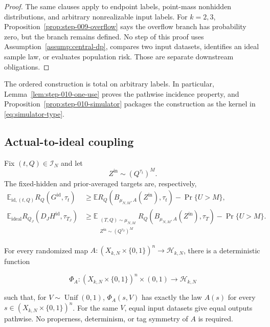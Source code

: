 \begin{proof}
The same clauses apply to endpoint labels, point-mass nonhidden
distributions, and arbitrary nonrealizable input labels. For \(k=2,3\),
Proposition~\ref{prop:step-009-overflow} says the overflow branch
has probability zero, but the branch remains defined. No step of this proof
uses Assumption~\ref{assump:central-dp}, compares two input datasets,
identifies an ideal sample law, or evaluates population risk. Those are
separate downstream obligations.
\end{proof}
The ordered construction is total on arbitrary labels.  In particular,
Lemma~\ref{lem:step-010-one-use} proves the pathwise incidence property,
and Proposition~\ref{prop:step-010-simulator} packages the construction as
the kernel in \eqref{eq:simulator-type}.

\subsection{Actual-to-ideal coupling}\label{app:step-011}
Fix $(t,Q)\in\mathcal I_N$ and let
\begin{equation}
Z^{\mathrm{in}}\sim(Q^{\tau_t})^M.
\tag{S11.3}\label{eq:coupling-input-law}
\end{equation}
The fixed-hidden and prior-averaged targets are, respectively,
\begin{align}
\mathbb E_{\mathrm{id},(t,Q)}R_Q(G^{\mathrm{id}},\tau_t)
&\ge
\mathbb E R_Q(B_{\mu_{N,M},A}(Z^{\mathrm{in}}),\tau_t)
-\Pr\{U>M\},
\tag{S11.4a}\label{eq:fixed-hidden-transfer}\\
\mathbb E_{\mathrm{ideal}}R_{Q_J}(D_JH^{\mathrm{id}},\tau_{T_J})
&\ge
\mathbb E_{\substack{(T,Q)\sim\mu_{N,M}\\
Z^{\mathrm{in}}\sim(Q^{\tau_T})^M}}
R_Q(B_{\mu_{N,M},A}(Z^{\mathrm{in}}),\tau_T)
-\Pr\{U>M\}.
\tag{S11.4b}\label{eq:prior-transfer}
\end{align}
\begin{lemma}\label{lem:step-011-shared-randomization}
For every randomized map
\(A:(X_{k,N}\times\{0,1\})^n\to\mathcal H_{k,N}\), there is a
deterministic function

\[
  \Phi_A:(X_{k,N}\times\{0,1\})^n\times(0,1)
  \longrightarrow\mathcal H_{k,N}
\]

such that, for \(V\sim\operatorname{Unif}(0,1)\),
\(\Phi_A(s,V)\) has exactly the law \(A(s)\) for every
\(s\in(X_{k,N}\times\{0,1\})^n\). For the same \(V\), equal input datasets give equal
outputs pathwise. No properness, determinism, or tag symmetry of \(A\) is
required.
\end{lemma}

